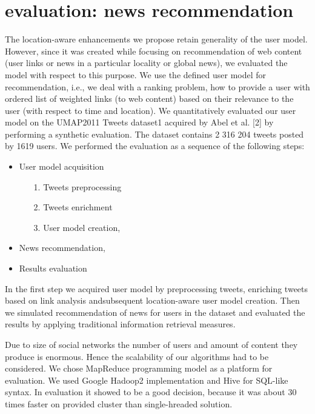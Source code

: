 \documentclass[a4, conference]{IEEEtran}
\begin{document}
\section{evaluation: news recommendation}

The   location-aware   enhancements   we   propose   retain generality  of  the  user model.  However,  since  it  was  created while  focusing  on  recommendation  of  web  content  (user links  or  news  in  a  particular  locality  or  global  news),  we evaluated the model with respect to this purpose. We use the defined user model for recommendation, i.e., we deal with a ranking  problem,  how  to  provide  a  user  with  ordered  list  of weighted  links  (to  web  content)  based on  their  relevance  to the user (with respect to time and location).  We   quantitatively   evaluated   our   user   model   on   the UMAP2011  Tweets  dataset1  acquired  by  Abel  et  al.  [2]  by performing   a   synthetic   evaluation.   The   dataset   contains 2 316 204 tweets posted by 1619 users. We   performed   the   evaluation   as   a   sequence   of   the following steps:~\cite{Abel2011}

\begin{itemize}
\item User model acquisition
	\begin{enumerate}
	\item [1.]Tweets preprocessing
	\item [2.] Tweets enrichment
	\item [3.] User model creation,
	\end{enumerate}
\item News recommendation,
\item Results evaluation
\end{itemize}

In the first step we acquired user model by preprocessing tweets,   enriching   tweets   based   on   link   analysis   andsubsequent  location-aware  user  model  creation.  Then  we simulated  recommendation  of  news  for  users  in  the  dataset and evaluated the results by applying traditional information retrieval measures. 

Due  to  size  of  social  networks  the  number  of  users and amount of  content  they  produce  is  enormous.  Hence  the scalability of our algorithms had to be considered. We chose MapReduce    programming    model    as    a    platform    for evaluation.  We  used  Google  Hadoop2 implementation  and Hive  for  SQL-like  syntax.  In  evaluation  it  showed  to  be  a good  decision,  because  it  was  about  30  times  faster  on provided cluster than single-hreaded solution. 
\end{document}
